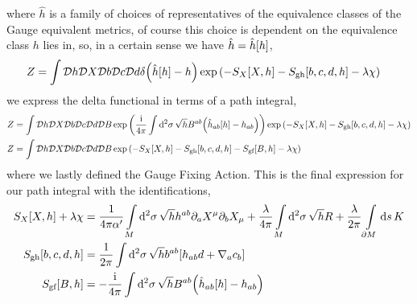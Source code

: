 where $\hat h$ is a family of choices of representatives of the equivalence classes of the Gauge equivalent metrics, of course this choice is 
dependent on the equivalence class $h$ lies in, so, in a certain sense we have $\hat h=\hat h\qty[h]$,
\begin{align*}
    Z&=\int\mathcal D h\mathcal D X\mathcal D b\mathcal D c\mathcal D d\delta\qty(\hat h\qty[h]-h)\exp\qty(-S_X\qty[X, h]-S_{\textnormal{gh}}\qty[b,c,d,h]-\lambda\chi)
\end{align*}
we express the delta functional in terms of a path integral,
\begin{align*}
    Z&=\int\mathcal D h\mathcal D X\mathcal D b\mathcal D c\mathcal D d\mathcal D B\exp\qty(\frac{\textnormal{i}}{4\pi}\int\dd[2]{\sigma}\sqrt{h}B^{ab}\qty(\hat h_{ab}\qty[h]-h_{ab}))\exp\qty(-S_X\qty[X, h]-S_{\textnormal{gh}}\qty[b,c,d,h]-\lambda\chi)\\
    Z&=\int\mathcal D h\mathcal D X\mathcal D b\mathcal D c\mathcal D d\mathcal D B\exp\qty(-S_X\qty[X, h]-S_{\textnormal{gh}}\qty[b,c,d,h]-S_{\textnormal{gf}}\qty[B,h]-\lambda\chi)
\end{align*}
where we lastly defined the Gauge Fixing Action. This is the final expression for our path integral with the identifications,
\begin{subequations}\label{actions}
\begin{align}
    S_X\qty[X, h]+\lambda\chi&=\frac{1}{4\pi\alpha'}\int\limits_M\dd[2]{\sigma}\sqrt{h}h^{ab}\partial_a X^\mu\partial_b X_\mu+\frac\lambda{4\pi}\int\limits_M\dd[2]{\sigma}\sqrt{h}R+\frac\lambda{2\pi}\int\limits_{\partial M}\dd{s}K\\
    S_{\textnormal{gh}}\qty[b,c,d,h]&=\frac{1}{2\pi}\int\dd[2]{\sigma}\sqrt{h}b^{ab}\qty[h_{ab}d+\nabla_{a}c_b]\\
    S_{\textnormal{gf}}\qty[B,h]&=-\frac{\textnormal{i}}{4\pi}\int\dd[2]{\sigma}\sqrt{h}B^{ab}\qty(\hat h_{ab}\qty[h]-h_{ab})
\end{align}
\end{subequations}